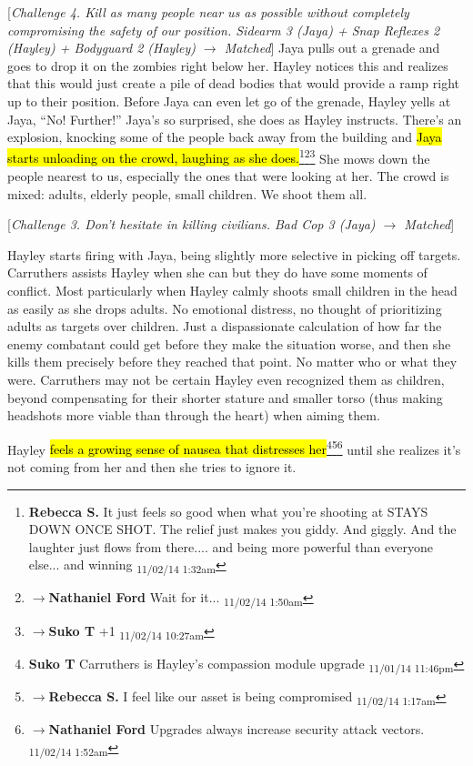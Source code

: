 {[}\textit{Challenge 4. Kill as many people near us as possible without completely compromising the safety of our position.  Sidearm 3 (Jaya) + Snap Reflexes 2 (Hayley) + Bodyguard 2 (Hayley) $\rightarrow$ Matched}{]}  Jaya pulls out a grenade and goes to drop it on the zombies right below her.  Hayley notices this and realizes that this would just create a pile of dead bodies that would provide a ramp right up to their position.  Before Jaya can even let go of the grenade, Hayley yells at Jaya, ``No! Further!''  Jaya's so surprised, she does as Hayley instructs.  There's an explosion, knocking some of the people back away from the building and \hl{Jaya starts unloading on the crowd, laughing as she does.}\footnote{\textbf{Rebecca S. }It just feels so good when what you're shooting at STAYS DOWN ONCE SHOT.  The relief just makes you giddy. And giggly. And the laughter just flows from there.... and being more powerful than everyone else... and winning \textsubscript{11/02/14 1:32am}}\footnote{$\rightarrow$\textbf{Nathaniel Ford }Wait for it... \textsubscript{11/02/14 1:50am}}\footnote{$\rightarrow$\textbf{Suko T }+1 \textsubscript{11/02/14 10:27am}}  She mows down the people nearest to us, especially the ones that were looking at her.  The crowd is mixed: adults, elderly people, small children.  We shoot them all.

{[}\textit{Challenge 3.  Don't hesitate in killing civilians.  Bad Cop 3 (Jaya) $\rightarrow$ Matched}{]}

Hayley starts firing with Jaya, being slightly more selective in picking off targets.  Carruthers assists Hayley when she can but they do have some moments of conflict.  Most particularly when Hayley calmly shoots small children in the head as easily as she drops adults.  No emotional distress, no thought of prioritizing adults as targets over children.  Just a dispassionate calculation of how far the enemy combatant could get before they make the situation worse, and then she kills them precisely before they reached that point.  No matter who or what they were.  Carruthers may not be certain Hayley even recognized them as children, beyond compensating for their shorter stature and smaller torso (thus making headshots more viable than through the heart) when aiming them.

Hayley \hl{feels a growing sense of nausea that distresses her}\footnote{\textbf{Suko T }Carruthers is Hayley's compassion module upgrade \textsubscript{11/01/14 11:46pm}}\footnote{$\rightarrow$\textbf{Rebecca S. }I feel like our asset is being compromised \textsubscript{11/02/14 1:17am}}\footnote{$\rightarrow$\textbf{Nathaniel Ford }Upgrades always increase security attack vectors. \textsubscript{11/02/14 1:52am}} until she realizes it's not coming from her and then she tries to ignore it.




